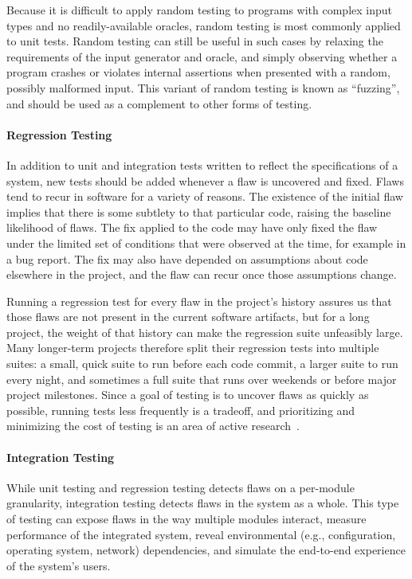 Because it is difficult to apply random testing to programs with
complex input types and no readily-available oracles, random testing
is most commonly applied to unit tests. Random testing can still be
useful in such cases by relaxing the requirements of the input
generator and oracle, and simply observing whether a program crashes
or violates internal assertions when presented with a random, possibly
malformed input. This variant of random testing is known as
``fuzzing'', and should be used as a complement to other forms of
testing.

\paragraph{Regression Testing}

In addition to unit and integration tests written to reflect the
specifications of a system, new tests should be added whenever a flaw
is uncovered and fixed. Flaws tend to recur in software for a variety
of reasons. The existence of the initial flaw implies that there is
some subtlety to that particular code, raising the baseline likelihood
of flaws. The fix applied to the code may have only fixed the flaw
under the limited set of conditions that were observed at the time,
for example in a bug report. The fix may also have depended on
assumptions about code elsewhere in the project, and the flaw can
recur once those assumptions change.

Running a regression test for every flaw in the project's history
assures us that those flaws are not present in the current software
artifacts, but for a long project, the weight of that history can make
the regression suite unfeasibly large. Many longer-term projects
therefore split their regression tests into multiple suites: a small,
quick suite to run before each code commit, a larger suite to run
every night, and sometimes a full suite that runs over weekends or
before major project milestones. Since a goal of testing is to uncover
flaws as quickly as possible, running tests less frequently is a
tradeoff, and prioritizing and minimizing the cost of testing is an
area of active research~\cite{yoo2012regression}.

\paragraph{Integration Testing}

While unit testing and regression testing detects flaws on a
per-module granularity, integration testing detects flaws in the
system as a whole. This type of testing can expose flaws in the way
multiple modules interact, measure performance of the integrated
system, reveal environmental (e.g., configuration, operating system,
network) dependencies, and simulate the end-to-end experience of the
system's users.


